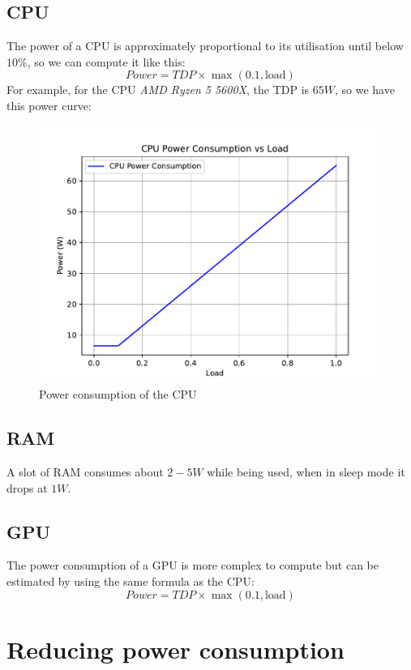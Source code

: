 \documentclass[12pt, openany]{report}
\theoremstyle{definition}
\begin{document}
\subsection{CPU}
The power of a CPU is approximately proportional to its utilisation until below $10\%$, so we can compute it like this:
\begin{equation}
	Power = TDP \times \max(0.1, \text{load})
\end{equation}
For example, for the CPU \textit{AMD Ryzen 5 5600X}, the TDP is $65W$, so we have this power curve:
\begin{figure}[H]
	\centering
	\includegraphics[width=0.8\linewidth]{img/CPU_power.pdf}
	\caption{Power consumption of the CPU}
	\label{fig:CPU_power}
\end{figure}
\subsection{RAM}
A slot of RAM consumes about $2-5W$ while being used, when in sleep mode it drops at $1 W$.
\subsection{GPU}
The power consumption of a GPU is more complex to compute but can be estimated by using the same formula as the CPU:
\begin{equation}
	Power = TDP \times \max(0.1, \text{load})
\end{equation}
\section{Reducing power consumption}
\end{document}
